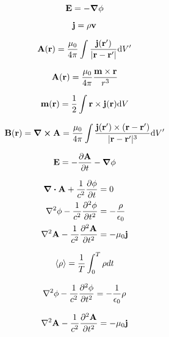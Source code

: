 \documentclass[11pt,twoside]{article}
\begin{document}
\begin{multicols}{3}
\begin{footnotesize}
\begin{equation}
\vb{E} = - \gradient \phi
\end{equation}

\begin{equation}
\vb{j} = \rho \vb{v}
\end{equation}

\begin{equation}
\vb{A}(\vb{r}) = \frac{\mu_0}{4\pi} \int \frac{\vb{j}(\vb{r'})}{|\vb{r}-\vb{r'}|}\dd V'
\end{equation}

\begin{equation}
\vb{A}(\vb{r}) = \frac{\mu_0}{4\pi} \frac{\vb{m}\times\vb{r}}{r^3}
\end{equation}

\begin{equation}
\vb{m}(\vb{r}) = \frac{1}{2} \int \vb{r} \times \vb{j}(\vb{r})\dd V
\end{equation}

\begin{equation}
\vb{B}(\vb{r}) = \curl \vb{A} = \frac{\mu_0}{4\pi} \int \frac{\vb{j}(\vb{r'})\times (\vb{r}-\vb{r'})}{|\vb{r}-\vb{r'}|^3} \dd V'
\end{equation}

\begin{equation}
\vb{E} = -\pdv{\vb{A}}{t} - \gradient \phi
\end{equation}

\begin{equation}
\begin{split}
\div{\vb{A}} + \frac{1}{c^2} \pdv{\phi}{t} &= 0 \\
\laplacian{\phi} - \frac{1}{c^2} \pdv[2]{\phi}{t} &= -\frac{\rho}{\epsilon_0} \\
\laplacian{\vb{A}} - \frac{1}{c^2} \pdv[2]{\vb{A}}{t} &= -\mu_0 \vb{j}
\end{split}
\end{equation}

\begin{equation}
\expval{\rho} = \frac{1}{T} \int_0^T \rho dt 
\end{equation}

\begin{equation}
\laplacian \phi - \frac{1}{c^2} \frac{\partial^2 \phi}{\partial t^2} = -\frac{1}{\epsilon_0}\rho
\end{equation}

\begin{equation}
\laplacian \vb{A} - \frac{1}{c^2} \frac{\partial^2 \vb{A}}{\partial t^2} = -\mu_0 \vb{j}
\end{equation}


\end{footnotesize}
\end{multicols}
\end{document}
